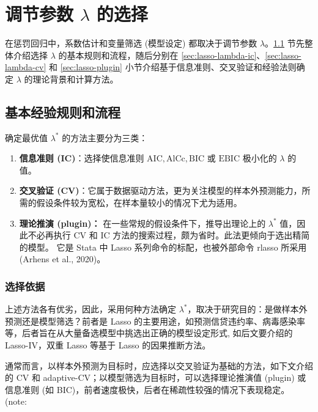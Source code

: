 


\section{调节参数 $\lambda$ 的选择}\label{sec:lasso-lambda}

在惩罚回归中，系数估计和变量筛选 (模型设定) 都取决于调节参数 $\lambda$。\ref{sec:lasso-lambda-intro} 节先整体介绍选择 $\lambda$ 的基本规则和流程，随后分别在 \ref{sec:lasso-lambda-ic}、\ref{sec:lasso-lambda-cv} 和 \ref{sec:lasso-plugin} 小节介绍基于信息准则、交叉验证和经验法则确定 $\lambda$ 的理论背景和计算方法。 

\subsection{基本经验规则和流程}\label{sec:lasso-lambda-intro}

确定最优值 $\lambda^*$ 的方法主要分为三类：
\begin{enumerate}
\item \textbf{信息准则 (IC)}：选择使信息准则 $\mathrm{AIC}, \mathrm{AlCc}, \mathrm{BIC}$ 或 $\mathrm{EBIC}$ 极小化的 $\lambda$ 的值。%
\item \textbf{交叉验证 (CV)}：它属于数据驱动方法，更为关注模型的样本外预测能力，所需的假设条件较为宽松，在样本量较小的情况下尤为适用。%
\item \textbf{理论推演 (plugin)：} 在一些常规的假设条件下，推导出理论上的 $\lambda^*$ 值，因此不必再执行 CV 和 IC 方法的搜索过程，颇为省时。此法更倾向于选出精简的模型。
它是 Stata 中 Lasso 系列命令的标配，也被外部命令 rlasso 所采用 (Arhens et al., 2020)。
\end{enumerate}

\subsubsection{选择依据}
上述方法各有优劣，因此，采用何种方法确定 $\lambda^*$，取决于研究目的：是做样本外预测还是模型筛选？前者是 Lasso 的主要用途，如预测信贷违约率、病毒感染率等，后者旨在从大量备选模型中挑选出正确的模型设定形式, 如后文要介绍的 Lasso-IV，双重 Lasso 等基于 Lasso 的因果推断方法。

通常而言，以样本外预测为目标时，应选择以交叉验证为基础的方法，如下文介绍的 CV 和 adaptive-CV；以模型筛选为目标时，可以选择理论推演值 (plugin) 或信息准则 (如 BIC)，前者速度极快，后者在稀疏性较强的情况下表现稳定。 (note: %

